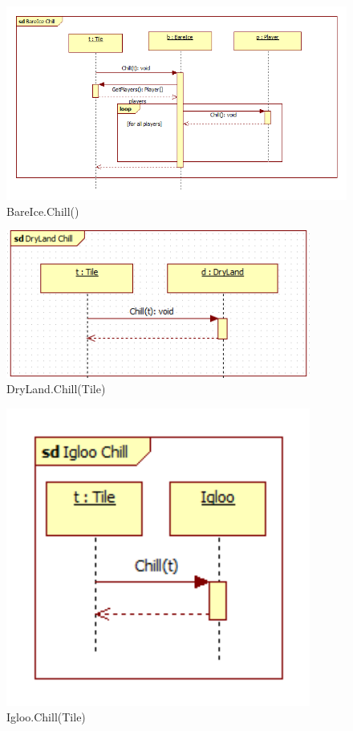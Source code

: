 \begin{figure}[H]
	\begin{center}
		\includegraphics[width=15cm]{chapters/chapter03/seqdiag/BareIce_Chill.png}
		\caption{BareIce.Chill()}
		\label{fig:BareIceChill}
	\end{center}
\end{figure}
\begin{figure}[H]
	\begin{center}
		\includegraphics[width=10cm]{chapters/chapter03/seqdiag/DryLand_Chill.png}
		\caption{DryLand.Chill(Tile)}
		\label{fig:DryLandChill}
	\end{center}
\end{figure}
\begin{figure}[H]
	\begin{center}
		\includegraphics[width=10cm]{chapters/chapter03/seqdiag/Igloo_Chill.png}
		\caption{Igloo.Chill(Tile)}
		\label{fig:IglooChill}
	\end{center}
\end{figure}
